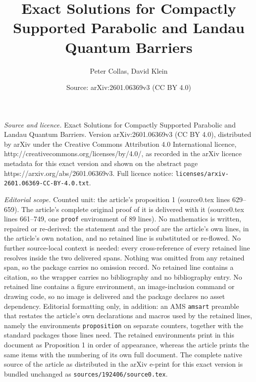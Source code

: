 \documentclass[10pt,a4paper]{amsart}
\title{Exact Solutions for Compactly Supported Parabolic and Landau Quantum Barriers}
\author{Peter Collas, David Klein}
\date{Source: arXiv:2601.06369v3 (CC BY 4.0)}
\begin{document}
\maketitle

\noindent\emph{Source and licence.} Exact Solutions for Compactly Supported Parabolic and Landau Quantum Barriers. Version arXiv:2601.06369v3 (CC BY 4.0), distributed by arXiv under the Creative Commons Attribution 4.0 International licence, http://creativecommons.org/licenses/by/4.0/, as recorded in the arXiv licence metadata for this exact version and shown on the abstract page https://arxiv.org/abs/2601.06369v3. Full licence notice: \texttt{licenses/arxiv-2601.06369-CC-BY-4.0.txt}.\par\smallskip

\noindent\textit{Editorial scope.} Counted unit: the article's proposition 1 (source0.tex lines 629--659). The article's complete original proof of it is delivered with it (source0.tex lines 661--749, one \texttt{proof} environment of 89 lines). No mathematics is written, repaired or re-derived: the statement and the proof are the article's own lines, in the article's own notation, and no retained line is substituted or re-flowed.  No further source-local context is needed: every cross-reference of every retained line resolves inside the two delivered spans.  Nothing was omitted from any retained span, so the package carries no omission record.  No retained line contains a citation, so the wrapper carries no bibliography and no bibliography entry.  No retained line contains a figure environment, an image-inclusion command or drawing code, so no image is delivered and the package declares no asset dependency.  Editorial formatting only, in addition: an AMS \texttt{amsart} preamble that restates the article's own declarations and macros used by the retained lines, namely the environments \texttt{proposition} on separate counters, together with the standard packages those lines need.  The retained environments print in this document as Proposition 1 in order of appearance, whereas the article prints the same items with the numbering of its own full document.  The complete native source of the article as distributed in the arXiv e-print for this exact version is bundled unchanged as \texttt{sources/192406/source0.tex}.
\end{document}
